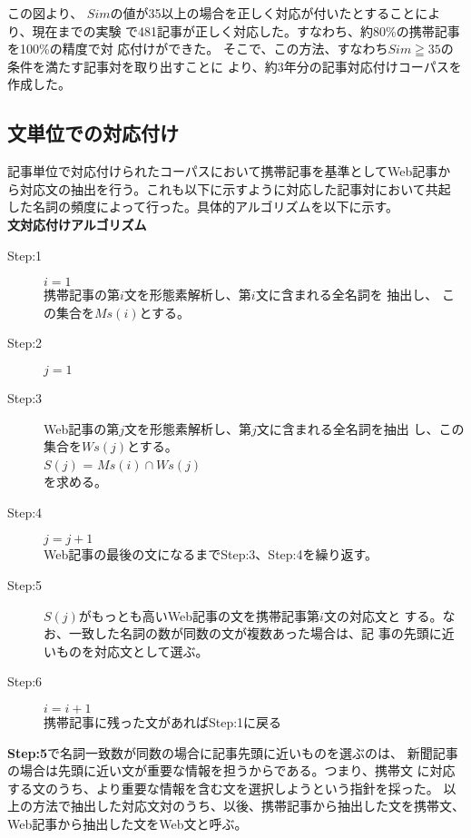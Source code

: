 \documentclass[jnlpbbl]{jnlp_j}
\begin{document}
この図より、
$Sim$の値が35以上の場合を正しく対応が付いたとすることにより、現在までの実験
で481記事が正しく対応した。すなわち、約80\%の携帯記事を100\%の精度で対
応付けができた。
そこで、この方法、すなわち$Sim \geqq 35$の条件を満たす記事対を取り出すことに
より、約3年分の記事対応付けコーパスを作成した。


\subsection{文単位での対応付け}\label{sub:bun-taiou}

記事単位で対応付けられたコーパスにおいて携帯記事を基準としてWeb記事か
ら対応文の抽出を行う。これも以下に示すように対応した記事対において共起
した名詞の頻度によって行った。具体的アルゴリズムを以下に示す。 \\

\noindent\textbf{文対応付けアルゴリズム}\\
\begin{description}
\item[Step:1] $i=1$\\
	   携帯記事の第$i$文を形態素解析し、第$i$文に含まれる全名詞を
抽出し、
	   この集合を$Ms(i)$とする。
\item[Step:2] $j=1$
\item[Step:3] Web記事の第$j$文を形態素解析し、第$j$文に含まれる全名詞を抽出
	   し、この集合を$Ws(j)$とする。\\
	   $S(j)$ = \textbar\mbox{$Ms(i) \cap Ws(j)$}\textbar\\
	   を求める。
\item[Step:4] $j=j+1$\\
	   Web記事の最後の文になるまでStep:3、Step:4を繰り返す。
\item[Step:5] $S(j)$がもっとも高いWeb記事の文を携帯記事第$i$文の対応文と
	   する。なお、一致した名詞の数が同数の文が複数あった場合は、記
	   事の先頭に近いものを対応文として選ぶ。
\item[Step:6] $i=i+1$\\
	   携帯記事に残った文があればStep:1に戻る\\
\end{description} 

\textbf{Step:5}で名詞一致数が同数の場合に記事先頭に近いものを選ぶのは、
新聞記事の場合は先頭に近い文が重要な情報を担うからである。つまり、携帯文
に対応する文のうち、より重要な情報を含む文を選択しようという指針を採った。
以上の方法で抽出した対応文対のうち、以後、携帯記事から抽出した文を携帯文、
Web記事から抽出した文をWeb文と呼ぶ。
\end{document}
